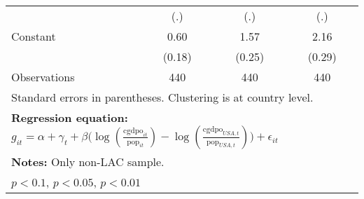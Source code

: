 \begin{table}[htbp]
\begin{tabular}{l*{3}{c}}
                &      (.)         &      (.)         &      (.)         \\
\addlinespace
Constant        &     0.60\sym{***}&     1.57\sym{***}&     2.16\sym{***}\\
                &   (0.18)         &   (0.25)         &   (0.29)         \\
\midrule
Observations    &      440         &      440         &      440         \\
\bottomrule
\multicolumn{4}{l}{\footnotesize Standard errors in parentheses. Clustering is at country level.}\\
\multicolumn{4}{l}{\footnotesize \textbf{Regression equation:} \(g_{it} = \alpha + \gamma_t + \beta \big(\log (\frac{\textrm{cgdpo}_{it}}{\textrm{pop}_{it}} ) - \log (\frac{\textrm{cgdpo}_{USA,t}}{\textrm{pop}_{USA,t}}  ) \big) + \epsilon_{it}\)}\\
\multicolumn{4}{l}{\footnotesize \textbf{Notes:} Only non-LAC sample.}\\
\multicolumn{4}{l}{\footnotesize \sym{*} \(p<0.1\), \sym{**} \(p<0.05\), \sym{***} \(p<0.01\)}\\
\end{tabular}
\end{table}
